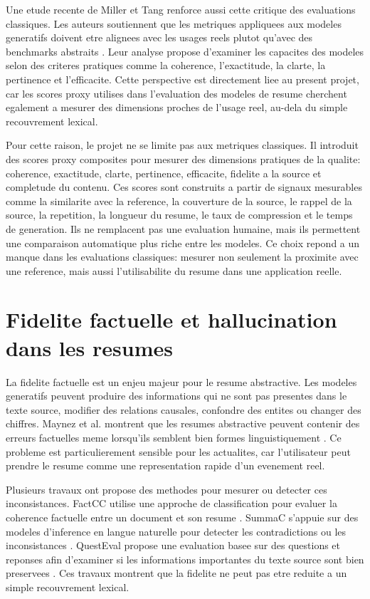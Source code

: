 Une etude recente de Miller et Tang renforce aussi cette critique des evaluations classiques. Les auteurs soutiennent que les metriques appliquees aux modeles generatifs doivent etre alignees avec les usages reels plutot qu'avec des benchmarks abstraits \cite{Miller2025LLMMetrics}. Leur analyse propose d'examiner les capacites des modeles selon des criteres pratiques comme la coherence, l'exactitude, la clarte, la pertinence et l'efficacite. Cette perspective est directement liee au present projet, car les scores proxy utilises dans l'evaluation des modeles de resume cherchent egalement a mesurer des dimensions proches de l'usage reel, au-dela du simple recouvrement lexical.

Pour cette raison, le projet ne se limite pas aux metriques classiques. Il introduit des scores proxy composites pour mesurer des dimensions pratiques de la qualite: coherence, exactitude, clarte, pertinence, efficacite, fidelite a la source et completude du contenu. Ces scores sont construits a partir de signaux mesurables comme la similarite avec la reference, la couverture de la source, le rappel de la source, la repetition, la longueur du resume, le taux de compression et le temps de generation. Ils ne remplacent pas une evaluation humaine, mais ils permettent une comparaison automatique plus riche entre les modeles. Ce choix repond a un manque dans les evaluations classiques: mesurer non seulement la proximite avec une reference, mais aussi l'utilisabilite du resume dans une application reelle.

\section{Fidelite factuelle et hallucination dans les resumes}

La fidelite factuelle est un enjeu majeur pour le resume abstractive. Les modeles generatifs peuvent produire des informations qui ne sont pas presentes dans le texte source, modifier des relations causales, confondre des entites ou changer des chiffres. Maynez et al. montrent que les resumes abstractive peuvent contenir des erreurs factuelles meme lorsqu'ils semblent bien formes linguistiquement \cite{Maynez2020Faithfulness}. Ce probleme est particulierement sensible pour les actualites, car l'utilisateur peut prendre le resume comme une representation rapide d'un evenement reel.

Plusieurs travaux ont propose des methodes pour mesurer ou detecter ces inconsistances. FactCC utilise une approche de classification pour evaluer la coherence factuelle entre un document et son resume \cite{Kryscinski2020FactCC}. SummaC s'appuie sur des modeles d'inference en langue naturelle pour detecter les contradictions ou les inconsistances \cite{Laban2022SummaC}. QuestEval propose une evaluation basee sur des questions et reponses afin d'examiner si les informations importantes du texte source sont bien preservees \cite{Scialom2021QuestEval}. Ces travaux montrent que la fidelite ne peut pas etre reduite a un simple recouvrement lexical.

